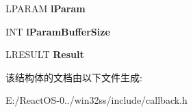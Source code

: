 \begin{DoxyCompactItemize}
L\+P\+A\+R\+AM {\bfseries l\+Param}
\item 
\mbox{\label{struct___w_i_n_d_o_w_p_r_o_c___c_a_l_l_b_a_c_k___a_r_g_u_m_e_n_t_s_a33f80b13aab535bb01bd639a0ac4cdc6}} 
I\+NT {\bfseries l\+Param\+Buffer\+Size}
\item 
\mbox{\label{struct___w_i_n_d_o_w_p_r_o_c___c_a_l_l_b_a_c_k___a_r_g_u_m_e_n_t_s_a7f56cfd3e25cb05973d4eeb0422df4b2}} 
L\+R\+E\+S\+U\+LT {\bfseries Result}
\end{DoxyCompactItemize}


该结构体的文档由以下文件生成\+:\begin{DoxyCompactItemize}
\item 
E\+:/\+React\+O\+S-\/0../win32ss/include/callback.\+h\end{DoxyCompactItemize}

